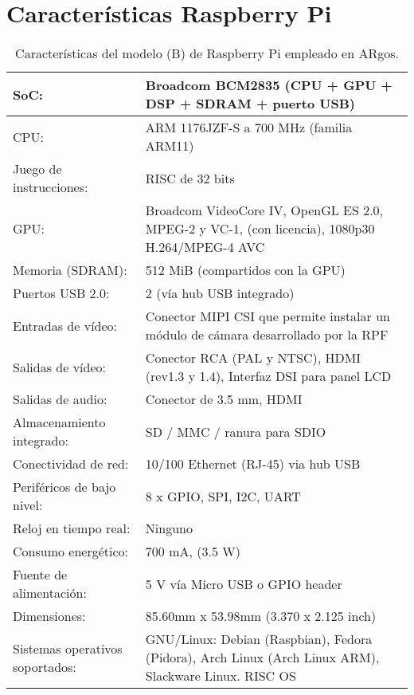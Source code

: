 \chapter{Características Raspberry Pi}
\label{chap:anexo_caracteristicas_rpi}

\begin{table}[h]
  \centering
  \begin{tabular}{|p{}p{}|}
    \hline
    SoC: & Broadcom BCM2835 (CPU + GPU + DSP + SDRAM + puerto USB) \\
    \hline
    CPU: & ARM 1176JZF-S a 700 MHz (familia ARM11) \\
    \hline
    Juego de instrucciones: & RISC de 32 bits \\
    \hline
    GPU: & Broadcom VideoCore IV, OpenGL ES 2.0, MPEG-2 y VC-1, (con licencia),
    1080p30 H.264/MPEG-4 AVC \\
    \hline
    Memoria (SDRAM): & 512 MiB (compartidos con la GPU) \\
    \hline
    Puertos USB 2.0: & 2 (vía hub USB integrado) \\
    \hline
    Entradas de vídeo: & Conector MIPI CSI que permite instalar un módulo de cámara desarrollado por la RPF \\
    \hline
    Salidas de vídeo: & Conector RCA (PAL y NTSC), HDMI (rev1.3 y 1.4), Interfaz DSI para panel LCD \\
    \hline
    Salidas de audio: & Conector de 3.5 mm, HDMI \\
    \hline
    Almacenamiento integrado: & SD / MMC / ranura para SDIO \\
    \hline
    Conectividad de red: & 10/100 Ethernet (RJ-45) via hub USB \\
    \hline
    Periféricos de bajo nivel: & 8 x GPIO, SPI, I2C, UART \\
    \hline
    Reloj en tiempo real: & Ninguno \\
    \hline
    Consumo energético: & 700 mA, (3.5 W) \\
    \hline
    Fuente de alimentación: & 5 V vía Micro USB o GPIO header \\
    \hline
    Dimensiones: & 85.60mm x 53.98mm (3.370 x 2.125 inch) \\
    \hline
    Sistemas operativos soportados: & GNU/Linux: Debian (Raspbian), Fedora (Pidora), Arch Linux
    (Arch Linux ARM), Slackware Linux. RISC OS \\
    \hline
  \end{tabular}
  \caption{Características del modelo (B) de Raspberry Pi empleado en ARgos.}
  \label{tab:raspberry_pi_caracteristicas}
\end{table}

